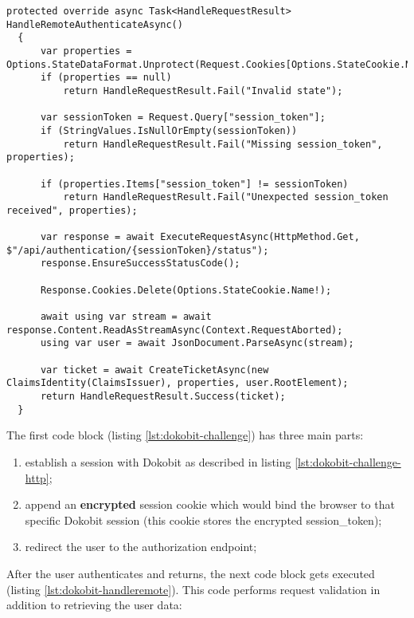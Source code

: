 \begin{lstlisting}[caption={Handling access token creation}, label={lst:dokobit-handleremote}]
  protected override async Task<HandleRequestResult> HandleRemoteAuthenticateAsync()
  {
      var properties = Options.StateDataFormat.Unprotect(Request.Cookies[Options.StateCookie.Name!]);
      if (properties == null)
          return HandleRequestResult.Fail("Invalid state");
  
      var sessionToken = Request.Query["session_token"];
      if (StringValues.IsNullOrEmpty(sessionToken))
          return HandleRequestResult.Fail("Missing session_token", properties);
  
      if (properties.Items["session_token"] != sessionToken)
          return HandleRequestResult.Fail("Unexpected session_token received", properties);
  
      var response = await ExecuteRequestAsync(HttpMethod.Get, $"/api/authentication/{sessionToken}/status");
      response.EnsureSuccessStatusCode();
  
      Response.Cookies.Delete(Options.StateCookie.Name!);
  
      await using var stream = await response.Content.ReadAsStreamAsync(Context.RequestAborted);
      using var user = await JsonDocument.ParseAsync(stream);
  
      var ticket = await CreateTicketAsync(new ClaimsIdentity(ClaimsIssuer), properties, user.RootElement);
      return HandleRequestResult.Success(ticket);
  }
\end{lstlisting}

The first code block (listing \ref{lst:dokobit-challenge}) has three main parts:

\begin{enumerate}
  \item establish a session with Dokobit as described in listing \ref{lst:dokobit-challenge-http};
  \item append an \textbf{encrypted} session cookie which would bind the browser to that specific Dokobit session (this cookie stores the encrypted session\_token);
  \item redirect the user to the authorization endpoint;
\end{enumerate}

After the user authenticates and returns, the next code block gets executed (listing \ref{lst:dokobit-handleremote}). This code performs request validation in addition to retrieving the user data:

